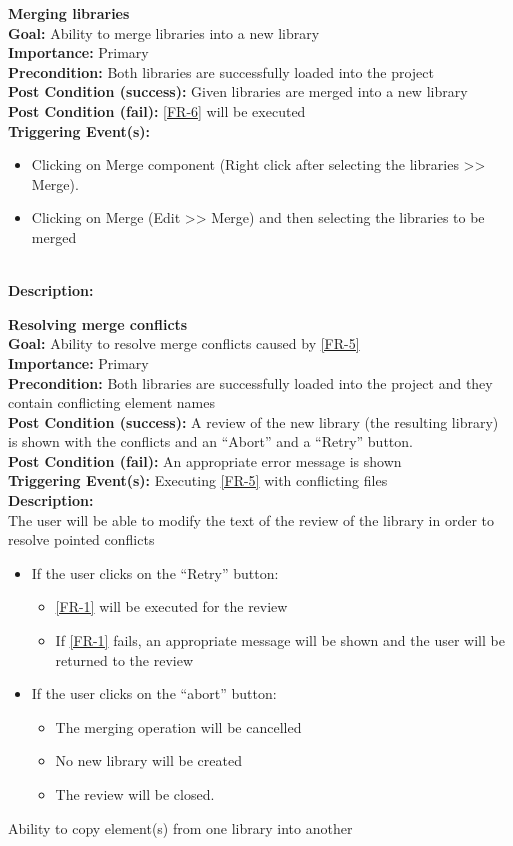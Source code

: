 \documentclass[10pt,a4paper]{report}
\newcommand{\precondition}[1]{
    \textbf{Precondition: } #1 \leavevmode \\
}
\newcommand{\FRDescription}[8]{
    \textbf{#1} \leavevmode \\
    \textbf{Goal: } #2 \leavevmode \\
    \textbf{Importance: } #3 \leavevmode \\
    \precondition{#4}
    \textbf{Post Condition (success): } #5 \leavevmode \\
    \textbf{Post Condition (fail): } #6 \leavevmode \\
    \textbf{Triggering Event(s): } #7 \leavevmode \\
    \textbf{Description: } \leavevmode \\ 
    #8}
\begin{document}
\begin{FR}
{\begin{itemize}
    \end{itemize}}
    \item \FRDescription{Merging libraries}
    {Ability to merge libraries into a new library}
    {Primary}
    {Both libraries are successfully loaded into the project}
    {Given libraries are merged into a new library}
    {\ref{FR-6} will be executed}
    {\begin{itemize}
        \item Clicking on Merge component (Right click after selecting the libraries >> Merge).
        \item Clicking on Merge (Edit >> Merge) and then selecting the libraries to be merged
    \end{itemize}}
    \item \FRDescription{Resolving merge conflicts}
    {Ability to resolve merge conflicts caused by \ref{FR-5}}
    {Primary}
    {Both libraries are successfully loaded into the project and they contain conflicting element names}
    {A review of the new library (the resulting library) is shown with the conflicts and an “Abort” and a “Retry” button.}
    {An appropriate error message is shown}
    {Executing \ref{FR-5} with conflicting files}
    {The user will be able to modify the text of the review of the library in order to resolve pointed conflicts
    \begin{itemize}
        \item If the user clicks on the “Retry” button:
        \begin{itemize}
            \item \ref{FR-1} will be executed for the review
            \item If \ref{FR-1} fails, an appropriate message will be shown and the user will be returned to the review
        \end{itemize}
        \item If the user clicks on the “abort” button:
        \begin{itemize}
            \item The merging operation will be cancelled
            \item No new library will be created
            \item The review will be closed.
        \end{itemize}
    \end{itemize}}
    \item {}
    {Ability to copy element(s) from one library into another}

\end{FR}
\end{document}

